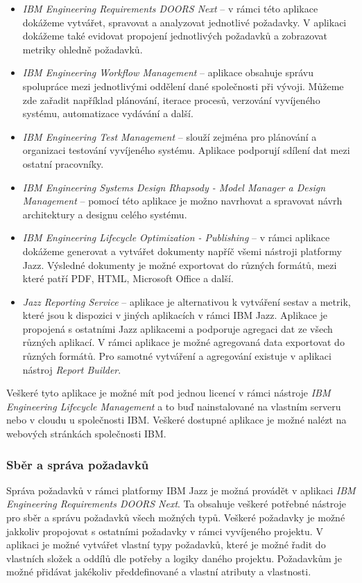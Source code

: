 \documentclass[czech,master,public,dept460,male,cpdeclaration,oneside]{diploma}
\begin{document}
\begin{itemize}
\item \textit{IBM Engineering Requirements DOORS Next} -- v rámci této aplikace dokážeme vytvářet, spravovat a analyzovat jednotlivé požadavky. V aplikaci dokážeme také evidovat propojení jednotlivých požadavků a zobrazovat metriky ohledně požadavků.
\item \textit{IBM Engineering Workflow Management} -- aplikace obsahuje správu spolupráce mezi jednotlivými oddělení dané společnosti při vývoji. Můžeme zde zařadit například plánování, iterace procesů, verzování vyvíjeného systému, automatizace vydávání a další.
\item \textit{IBM Engineering Test Management} -- slouží zejména pro plánování a organizaci testování vyvíjeného systému. Aplikace podporují sdílení dat mezi ostatní pracovníky.
\item \textit{IBM Engineering Systems Design Rhapsody - Model Manager a Design Management} -- pomocí této aplikace je možno navrhovat a spravovat návrh architektury a designu celého systému.
\item \textit{IBM Engineering Lifecycle Optimization - Publishing} -- v rámci aplikace dokážeme generovat a vytvářet dokumenty napříč všemi nástroji platformy Jazz. Výsledné dokumenty je možné exportovat do různých formátů, mezi které patří PDF, HTML, Microsoft Office a další.
\item \textit{Jazz Reporting Service} -- aplikace je alternativou k vytváření sestav a metrik, které jsou k dispozici v jiných aplikacích v rámci IBM Jazz. Aplikace je propojená s ostatními Jazz aplikacemi a podporuje agregaci dat ze všech různých aplikací. V rámci aplikace je možné agregovaná data exportovat do různých formátů. Pro samotné vytváření a agregování existuje v aplikaci nástroj \textit{Report Builder}.
\end{itemize}

Veškeré tyto aplikace je možné mít pod jednou licencí v rámci nástroje \textit{IBM Engineering Lifecycle Management} a to buď nainstalované na vlastním serveru nebo v cloudu u společnosti IBM. Veškeré dostupné aplikace je možné nalézt na webových stránkách společnosti IBM. \cite{ref:jazz_products}

\subsubsection{Sběr a správa požadavků}
Správa požadavků v rámci platformy IBM Jazz je možná provádět v aplikaci \textit{IBM Engineering Requirements DOORS Next}. Ta obsahuje veškeré potřebné nástroje pro sběr a správu požadavků všech možných typů. Veškeré požadavky je možné jakkoliv propojovat s ostatními požadavky v rámci vyvíjeného projektu. V aplikaci je možné vytvářet vlastní typy požadavků, které je možné řadit do vlastních složek a oddílů dle potřeby a logiky daného projektu. Požadavkům je možné přidávat jakékoliv předdefinované a vlastní atributy a vlastnosti.
\end{document}
